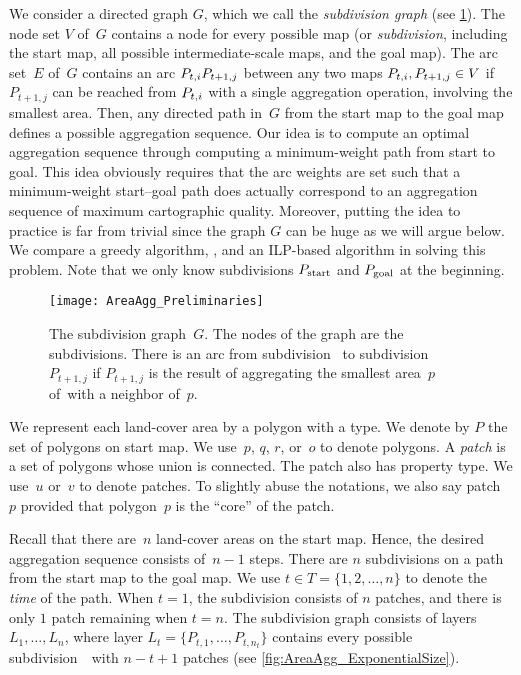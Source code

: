 We consider a directed graph $G$, 
which we call the \emph{subdivision graph} 
(see \fig\ref{fig:AreaAgg_SubdivisionName}). 
The node set $V$ of~$G$ contains a node for every
possible map (or \emph{subdivision}, including the start map, all
possible intermediate-scale maps, and the goal map).
The arc set~$E$ of~$G$ contains an arc $P_{t,i} P_{t+1,j}$ 
between any two maps $P_{t,i}, P_{t+1,j} \in V$ 
if $P_{t+1,j}$ can be reached from $P_{t,i}$ 
with a single aggregation operation,
involving the smallest area.
Then, any directed path in~$G$ from the start map to the goal map
defines a possible aggregation sequence.
Our idea is to compute an optimal aggregation sequence through 
computing a minimum-weight path from start to goal.
This idea obviously requires that the arc weights are 
set such that a minimum-weight start--goal
path does actually correspond to an aggregation sequence of 
maximum cartographic quality.  
Moreover, putting the idea to practice is far from trivial 
since the graph $G$ can be huge as we will argue below.
We compare a greedy algorithm, \Astar, and an ILP-based algorithm
in solving this problem.
Note that we only know subdivisions 
$P_\mathrm{start}$ and $P_\mathrm{goal}$ at the beginning. 


\begin{figure}[tb]
	\centering
	\texttt{[image: AreaAgg\_Preliminaries]}
	\caption{The subdivision graph~$G$. 
		The nodes of the graph are the subdivisions. 
		There is an arc	from subdivision~\Pnode 
		to subdivision~${P}_{t+1,j}$ 
		if ${P}_{t+1,j}$ is the result of 
		aggregating the smallest area~$p$ of~\Pnode with a 
		neighbor of~$p$.}
	\label{fig:AreaAgg_SubdivisionName}
\end{figure}

We represent each land-cover area by a polygon with a type.
We denote by $P$ the set of polygons on start map.
We use~$p$, $q$, $r$, or~$o$ to denote polygons.
A \emph{patch} is a set of polygons whose union is connected. 
The patch also has property type.
We use~$u$ or~$v$ to denote patches.
To slightly abuse the notations, we also say patch~$p$
provided that polygon~$p$ is the ``core'' of the patch.


Recall that there are~$n$ land-cover areas on the start	map. 
Hence, the desired aggregation sequence consists of~$n-1$ steps. 
There are $n$ subdivisions on a path 
from the start map to the goal map. 
We use $t \in {T}=\{1,2,\dots,n\}$ to denote 
the \emph{time} of the path. 
When $t=1$, the subdivision consists of $n$ patches, 
and there is only $1$ patch remaining when $t=n$.
The subdivision graph consists of layers~${L}_1,\dots,{L}_n$, 
where layer ${L}_t=\{{P}_{t,1},\dots,{P}_{t,n_t}\}$
contains every possible subdivision~\Pnode\ with 
$n-t+1$ patches (see \fig\ref{fig:AreaAgg_ExponentialSize}).

